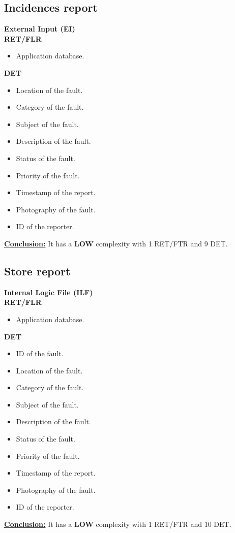 \subsection{Incidences report}
\textbf{External Input (EI)} \\ 
\textbf{RET/FLR}
\begin{itemize}
\item Application database.
\end{itemize}
\textbf{DET}
\begin{itemize}
\item Location of the fault.
\item Category of the fault.
\item Subject of the fault.
\item Description of the fault.
\item Status of the fault.
\item Priority of the fault.
\item Timestamp of the report.
\item Photography of the fault.
\item ID of the reporter.
\end{itemize}
\textbf{\underline{Conclusion:}} It has a \textbf{LOW} complexity with 1 RET/FTR and 9 DET.

\subsection{Store report}
\textbf{Internal Logic File (ILF)} \\ 
\textbf{RET/FLR}
\begin{itemize}
\item Application database.
\end{itemize}
\textbf{DET}
\begin{itemize}
\item ID of the fault.
\item Location of the fault.
\item Category of the fault.
\item Subject of the fault.
\item Description of the fault.
\item Status of the fault.
\item Priority of the fault.
\item Timestamp of the report.
\item Photography of the fault.
\item ID of the reporter.
\end{itemize}
\textbf{\underline{Conclusion:}} It has a \textbf{LOW} complexity with 1 RET/FTR and 10 DET.


